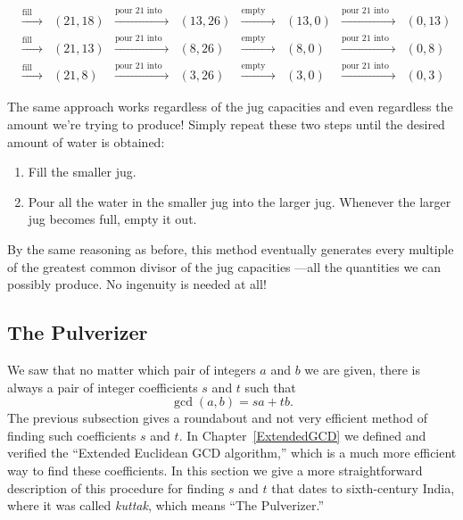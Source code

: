 \[\begin{array}{ccccccccc}
& \xrightarrow{\text{fill 21}} & (21,18)& \xrightarrow{\text{pour 21 into 26}} & (13,26)& \xrightarrow{\text{empty 26}} & (13,0)& \xrightarrow{\text{pour 21 into 26}} & (0,13)\\
& \xrightarrow{\text{fill 21}} & (21,13)& \xrightarrow{\text{pour 21 into 26}} & (8,26)& \xrightarrow{\text{empty 26}} & (8,0)& \xrightarrow{\text{pour 21 into 26}} & (0,8)\\
& \xrightarrow{\text{fill 21}} & (21,8)& \xrightarrow{\text{pour 21 into 26}} & (3,26)& \xrightarrow{\text{empty 26}} & (3,0)& \xrightarrow{\text{pour 21 into 26}} & (0,3)
\end{array}
\]
%

The same approach works regardless of the jug capacities and even
regardless the amount we're trying to produce!  Simply repeat these two
steps until the desired amount of water is obtained:
\begin{enumerate}
\item Fill the smaller jug.
\item Pour all the water in the smaller jug into the larger jug.
Whenever the larger jug becomes full, empty it out.
\end{enumerate}

By the same reasoning as before, this method eventually generates every
multiple of the greatest common divisor of the jug capacities ---all the
quantities we can possibly produce.  No ingenuity is needed at all!


\subsection{The Pulverizer}
\label{sec:pulverizer}

We saw that no matter which pair of integers $a$ and $b$ we
are given, there is always a pair of integer coefficients $s$ and $t$
such that     
\[
\gcd(a, b)  =  s a + t b.
\]
The previous subsection gives a roundabout and not very efficient method
of finding such coefficients $s$ and $t$.  In Chapter~\ref{ExtendedGCD} we
defined and verified the ``Extended Euclidean GCD algorithm,'' which is a
much more efficient way to find these coefficients.  In this section we
give a more straightforward description of this procedure for finding $s$
and $t$ that dates to sixth-century India, where it was called {\em
  kuttak}, which means ``The Pulverizer.''

